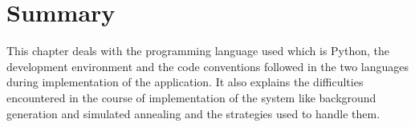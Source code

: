 \section{Summary}
This chapter deals with the programming language used which is Python, the development environment and the code conventions followed in the two languages during implementation of the application. It also explains the difficulties encountered in the course of implementation of the system like background generation and simulated annealing and the strategies used to handle them.